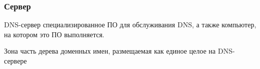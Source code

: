 \begin{frame}
    \frametitle{Сервер}
   \begin{block}{DNS-сервер}
    специализированное ПО для обслуживания DNS, а также компьютер, на котором это ПО выполняется.
   \end{block} 
    \begin{block}{Зона}
     часть дерева доменных имен, размещаемая как единое целое на DNS-сервере 
    \end{block}
\end{frame}